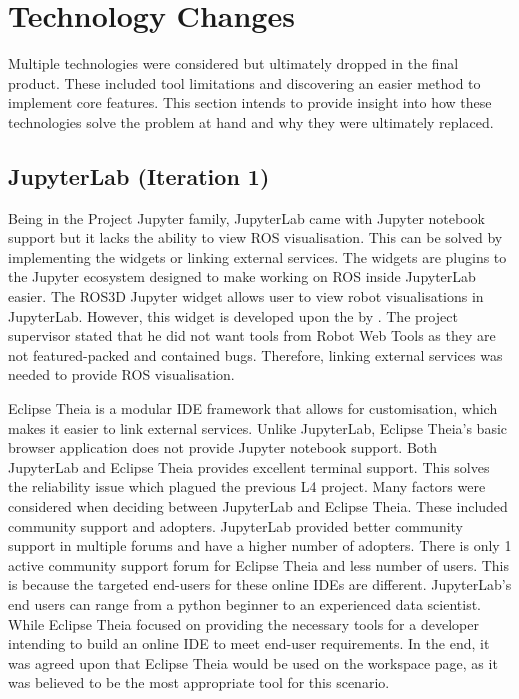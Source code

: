 \documentclass{l4proj}
\begin{document}
\section {Technology Changes}
Multiple technologies were considered but ultimately dropped in the final product. These included tool limitations and discovering an easier method to implement core features. This section intends to provide insight into how these technologies solve the problem at hand and why they were ultimately replaced. 

\subsection {JupyterLab (Iteration 1)}

Being in the Project Jupyter family, JupyterLab came with Jupyter notebook support but it lacks the ability to view ROS visualisation. This can be solved by implementing the \cite{rosjupyter} widgets or linking external services. The widgets are plugins to the Jupyter ecosystem designed to make working on ROS inside JupyterLab easier. The ROS3D Jupyter widget allows user to view robot visualisations in JupyterLab. However, this widget is developed upon the \cite{rwt} by \cite{rwtpaper}. The project supervisor stated that he did not want tools from Robot Web Tools as they are not featured-packed and contained bugs. Therefore, linking external services was needed to provide ROS visualisation.

Eclipse Theia is a modular IDE framework that allows for customisation, which makes it easier to link external services. Unlike JupyterLab, Eclipse Theia's basic browser application does not provide Jupyter notebook support. Both JupyterLab and Eclipse Theia provides excellent terminal support. This solves the \cite{Butterfly} reliability issue which plagued the previous L4 project. Many factors were considered when deciding between JupyterLab and Eclipse Theia. These included community support and adopters. JupyterLab provided better community support in multiple forums and have a higher number of adopters. There is only 1 active community support forum for Eclipse Theia and less number of users. This is because the targeted end-users for these online IDEs are different. JupyterLab's end users can range from a python beginner to an experienced data scientist. While Eclipse Theia focused on providing the necessary tools for a developer intending to build an online IDE to meet end-user requirements. In the end, it was agreed upon that Eclipse Theia would be used on the workspace page, as it was believed to be the most appropriate tool for this scenario.
\end{document}
